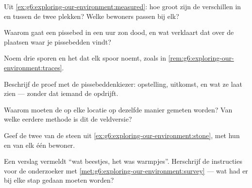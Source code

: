 \begin{exercise}[$\star$]\label{exo:g6:exploring-our-environment:4}
Uit \cref{ex:g6:exploring-our-environment:measured}: hoe groot zijn de
verschillen in  en  tussen de twee plekken? Welke
bewoners passen bij elk?
\end{exercise}

\begin{exercise}[$\star$]\label{exo:g6:exploring-our-environment:5}
Waarom gaat een pissebed in een uur zon dood, en wat verklaart dat over
de plaatsen waar je pissebedden vindt?
\end{exercise}

\begin{exercise}[$\star$]\label{exo:g6:exploring-our-environment:6}
Noem drie sporen en het  dat elk spoor noemt, zoals in
\cref{rem:g6:exploring-our-environment:traces}.
\end{exercise}

\begin{exercise}[$\star\star$]\label{exo:g6:exploring-our-environment:7}
Beschrijf de proef met de pissebeddenkiezer: opstelling, uitkomst, en
wat ze laat zien --- zonder dat iemand de  opdrijft.
\end{exercise}

\begin{exercise}[$\star\star$]\label{exo:g6:exploring-our-environment:8}
Waarom moeten de  op elke locatie op dezelfde manier
gemeten worden? Van welke eerdere methode is dit de veldversie?
\end{exercise}

\begin{exercise}[$\star\star$]\label{exo:g6:exploring-our-environment:9}
Geef de twee  van de steen uit
\cref{ex:g6:exploring-our-environment:stone}, met hun  en
van elk één bewoner.
\end{exercise}

\begin{exercise}[$\star\star$]\label{exo:g6:exploring-our-environment:10}
Een verslag vermeldt ``wat beestjes, het was warmpjes''. Herschrijf de
instructies voor de onderzoeker met
\cref{met:g6:exploring-our-environment:survey} --- wat had er bij elke
stap gedaan moeten worden?
\end{exercise}


